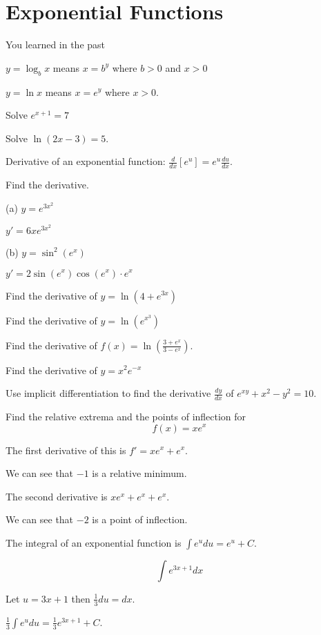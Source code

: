 \documentclass[../bccalc.tex]{subfiles}
\begin{document}
\section{Exponential Functions}
You learned in the past 

$y=\log_b x$ means $x=b^y$ where $b>0$ and $x>0$

$y=\ln x$ means $x=e^y$ where $x>0$.

\ex Solve $e^{x+1}=7$

\ex Solve $\ln(2x-3)=5$.

Derivative of an exponential function: $\frac{d}{dx}[e^u]=e^u \frac{du}{dx}$.

\pagebreak
\begin{example}
    Find the derivative.

    (a) $y=e^{3x^2}$

    $y'=6xe^{3x^2}$

    (b) $y=\sin^2 (e^x)$

    $y'=2\sin(e^x)\cos(e^x)\cdot e^x$
\end{example}

\ex Find the derivative of $y=\ln(4+e^{3x})$

\ex Find the derivative of $y=\ln(e^{x^3})$

\ex Find the derivative of $f(x)=\ln\left(\frac{3+e^x}{3-e^x}\right)$.

\ex Find the derivative of $y=x^2e^{-x}$

\ex Use implicit differentiation to find the derivative $\frac{dy}{dx}$ of $e^{xy}+x^2-y^2=10$.

\begin{example}
    Find the relative extrema and the points of inflection for 
    \[ f(x)=xe^x \]

    The first derivative of this is $f'=xe^x+e^x$.

    We can see that $-1$ is a relative minimum.

    The second derivative is $xe^x+e^x+e^x$.

    We can see that $-2$ is a point of inflection.
\end{example}

The integral of an exponential function is $\int e^u du = e^u + C$.

\begin{example}
    \[ \int e^{3x+1}dx \]

    Let $u=3x+1$ then $\frac{1}{3}du=dx$.

    $\frac{1}{3}\int e^u du = \frac{1}{3}e^{3x+1}+C$.
\end{example}
\end{document}
